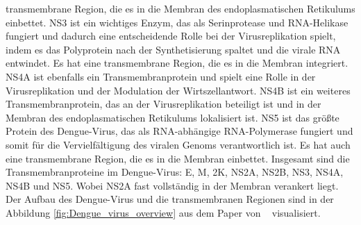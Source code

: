 \documentclass[german,version-2022-01]{uzl-thesis}
\begin{document}
transmembrane Region, die es in die Membran des endoplasmatischen Retikulums einbettet. NS3 ist ein wichtiges Enzym, das als Serinprotease und RNA-Helikase fungiert und dadurch eine entscheidende Rolle bei der Virusreplikation spielt, indem es das Polyprotein nach der Synthetisierung spaltet und die virale RNA entwindet. Es hat eine transmembrane Region, die es in die Membran integriert. NS4A ist ebenfalls ein Transmembranprotein und spielt eine Rolle in der Virusreplikation und der Modulation der Wirtszellantwort. NS4B ist ein weiteres Transmembranprotein, das an der Virusreplikation beteiligt ist und in der Membran des endoplasmatischen Retikulums lokalisiert ist. NS5 ist das gr\"o\ss{}te Protein des Dengue-Virus, das als RNA-abh\"angige RNA-Polymerase fungiert und somit f\"ur die Vervielf\"altigung des viralen Genoms verantwortlich ist. Es hat auch eine transmembrane Region, die es in die Membran einbettet.
Insgesamt sind die Transmembranproteine im Dengue-Virus: E, M, 2K, NS2A, NS2B, NS3, NS4A, NS4B und NS5. Wobei NS2A fast vollst\"andig in der Membran verankert liegt. Der Aufbau des Dengue-Virus und die transmembranen Regionen sind in der Abbildung \ref{fig:Dengue_virus_overview} aus dem Paper  von \citeauthor{perera_structural_2008}~\cite{perera_structural_2008} visualisiert. 
\end{document}
